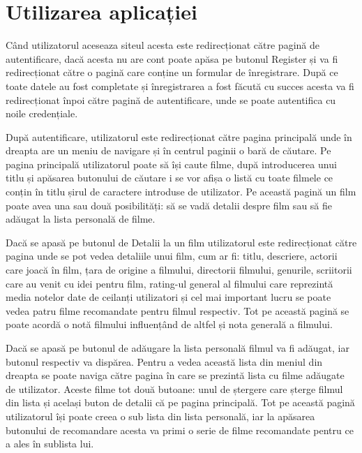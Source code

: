 \section{Utilizarea aplicației}
\label{sec:ch3sec2}
\par Când utilizatorul aceseaza siteul acesta este redirecționat către pagină de autentificare, dacă acesta nu are cont poate apăsa pe butonul Register și va fi redirecționat către o pagină care conține un formular de înregistrare. După ce toate datele au fost completate și înregistrarea a fost făcută cu succes acesta va fi redirecționat înpoi către pagină de autentificare, unde se poate autentifica cu noile credențiale.
\par După autentificare, utilizatorul este redirecționat către pagina principală unde în dreapta are un meniu de navigare și în centrul paginii o bară de căutare. Pe pagina principală utilizatorul poate să își caute filme, după introducerea unui titlu și apăsarea butonului de căutare i se vor afișa o listă cu toate filmele ce conțin în titlu șirul de caractere introduse de utilizator. Pe această pagină un film poate avea una sau două posibilități: să se vadă detalii despre film sau să fie adăugat la lista personală de filme.
\par Dacă se apasă pe butonul de Detalii la un film utilizatorul este redirecționat către pagina unde se pot vedea detaliile unui film, cum ar fi: titlu, descriere, actorii care joacă în film, țara de origine a filmului, directorii filmului, genurile, scriitorii care au venit cu idei pentru film, rating-ul general al filmului care reprezintă media notelor date de ceilanți utilizatori și cel mai important lucru se poate vedea patru filme recomandate pentru filmul respectiv. Tot pe această pagină se poate acordă o notă filmului influențând de altfel și nota generală a filmului.
\par Dacă se apasă pe butonul de adăugare la lista personală filmul va fi adăugat, iar butonul respectiv va dispărea. Pentru a vedea această lista din meniul din dreapta se poate naviga către pagina în care se prezintă lista cu filme adăugate de utilizator. Aceste filme tot două butoane: unul de ștergere care șterge filmul din lista și același buton de detalii că pe pagina principală. Tot pe această pagină utilizatorul își poate creea o sub lista din lista personală, iar la apăsarea butonului de recomandare acesta va primi o serie de filme recomandate pentru ce a ales în sublista lui.

